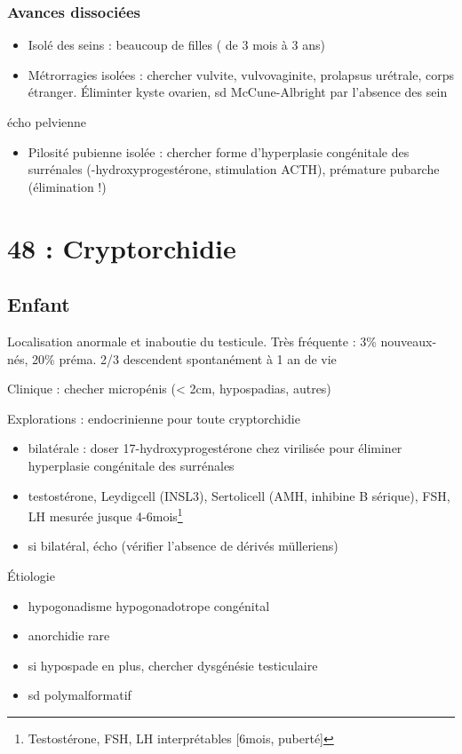 \documentclass[11pt]{article}
\begin{document}
\subsubsection{Avances dissociées}
\label{sec:orgcaf2949}
\begin{itemize}
\item Isolé des seins : beaucoup de filles ( de 3 mois à 3 ans)
\item Métrorragies isolées : chercher vulvite, vulvovaginite, prolapsus urétrale,
corps étranger. Éliminter kyste ovarien, sd McCune-Albright par l'absence des
sein
\end{itemize}
\thus écho pelvienne
\begin{itemize}
\item Pilosité pubienne isolée : chercher forme d'hyperplasie congénitale des
surrénales (-hydroxyprogestérone, stimulation ACTH), prémature pubarche
(élimination !)
\end{itemize}

\section{48 : Cryptorchidie}
\label{sec:org001efac}
\subsection{Enfant}
\label{sec:orgf727aee}
Localisation anormale et inaboutie du testicule. Très fréquente : 3\%
nouveaux-nés, 20\% préma. 2/3 descendent spontanément à 1 an de vie

Clinique : checher micropénis (< 2cm, hypospadias, autres)

Explorations : endocrinienne pour toute cryptorchidie \danger
\begin{itemize}
\item bilatérale : doser 17-hydroxyprogestérone chez \female{} virilisée pour éliminer hyperplasie
congénitale des surrénales
\item testostérone, \gls{Leydigcell} (INSL3), \gls{Sertolicell} (AMH, inhibine B sérique), FSH, LH mesurée jusque 4-6mois\footnote{\danger Testostérone, FSH, LH interprétables [6mois, puberté]}
\item si bilatéral, écho (vérifier l'absence de dérivés mülleriens)
\end{itemize}

Étiologie
\begin{itemize}
\item hypogonadisme hypogonadotrope congénital
\item anorchidie rare
\item si hypospade en plus, chercher dysgénésie testiculaire
\item sd polymalformatif
\end{itemize}
\end{document}
